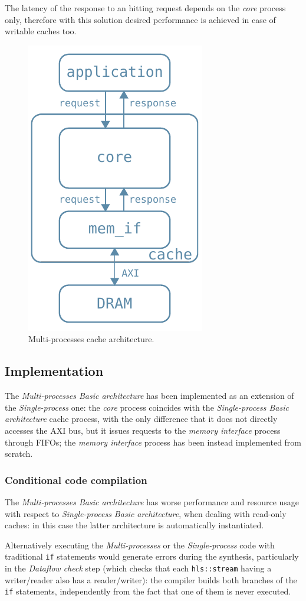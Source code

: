 \documentclass[11pt,a4paper]{memoir}
\begin{document}
The latency of the response to an hitting request depends on the \emph{core}
process only, therefore with this solution desired performance is achieved in
case of writable caches too.

\begin{figure}
	\centering
	\includegraphics[width=.3\textwidth]{basic_arch_inner}
	\caption{Multi-processes cache architecture.}
	\label{fig:basic_arch_inner}
\end{figure}

\subsection{Implementation}
The \emph{Multi-processes Basic architecture} has been implemented as an
extension of the \emph{Single-process} one: the \emph{core} process coincides
with the \emph{Single-process Basic architecture} cache process, with the only
difference that it does not directly accesses the AXI bus, but it issues
requests to the \emph{memory interface} process through FIFOs; the \emph{memory
interface} process has been instead implemented from scratch.

\subsubsection{Conditional code compilation}
The \emph{Multi-processes Basic architecture} has worse performance and
resource usage with respect to \emph{Single-process Basic architecture}, when
dealing with read-only caches: in this case the latter architecture is
automatically instantiated.

Alternatively executing the \emph{Multi-processes} or the \emph{Single-process}
code with traditional \texttt{if} statements would generate errors during the
synthesis, particularly in the \emph{Dataflow check} step (which checks that
each \texttt{hls::stream} having a writer/reader also has a reader/writer):
the compiler builds both branches of the \texttt{if} statements, independently
from the fact that one of them is never executed.
\end{document}
